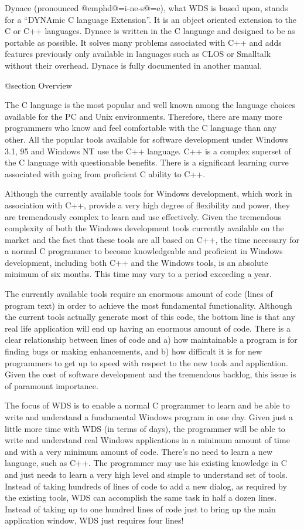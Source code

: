 Dynace (pronounced @emph{d@=i-ne-s@=e}), what WDS is based upon, stands
for a ``DYNAmic C language Extension''.  It is an object oriented
extension to the C or C++ languages.  Dynace is written in the C
language and designed to be as portable as possible.  It solves many
problems associated with C++ and adds features previously only available
in languages such as CLOS or Smalltalk without their overhead.  Dynace
is fully documented in another manual.

@section Overview

The C language is the most popular and well known among the language
choices available for the PC and Unix environments.  Therefore, there
are many more programmers who know and feel comfortable with the C
language than any other.  All the popular tools available for software
development under Windows 3.1, 95 and Windows NT use the C++
language. C++ is a complex superset of the C language with questionable
benefits.  There is a significant learning curve associated with going
from proficient C ability to C++.


Although the currently available tools for Windows development, which
work in association with C++, provide a very high degree of flexibility
and power, they are tremendously complex to learn and use effectively.
Given the tremendous complexity of both the Windows development tools
currently available on the market and the fact that these tools are all
based on C++, the time necessary for a normal C programmer to become
knowledgeable and proficient in Windows development, including both C++
and the Windows tools, is an absolute minimum of six months.  This time
may vary to a period exceeding a year.

The currently available tools require an enormous amount of code (lines
of program text) in order to achieve the most fundamental functionality.
Although the current tools actually generate most of this code, the
bottom line is that any real life application will end up having an
enormous amount of code.  There is a clear relationship between lines of
code and a) how maintainable a program is for finding bugs or making
enhancements, and b) how difficult it is for new programmers to get up
to speed with respect to the new tools and application.  Given the cost
of software development and the tremendous backlog, this issue is of
paramount importance.

The focus of WDS is to enable a normal C programmer to learn and be able
to write and understand a fundamental Windows program in one day.  Given
just a little more time with WDS (in terms of days), the programmer will
be able to write and understand real Windows applications in a minimum
amount of time and with a very minimum amount of code.  There's no need
to learn a new language, such as C++.  The programmer may use his
existing knowledge in C and just needs to learn a very high level and
simple to understand set of tools.  Instead of taking hundreds of lines
of code to add a new dialog, as required by the existing tools, WDS can
accomplish the same task in half a dozen lines.  Instead of taking up to
one hundred lines of code just to bring up the main application window,
WDS just requires four lines!

